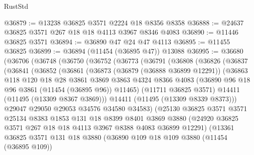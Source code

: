 \begin{lexlean}{RustStd}
\begin{coremodule}
@36879 := @13238 @36825 @3571 @2224 @18 @8356 @8358
@36888 := @24637 @36825 @3571 @267 @18 @18 @4113 @3967 @8346 @4083
@36890 := @11446 @36825 @3571
@36894 := @36890 @47 @24 @47 @4113
@36895 := @11455 @36825
@36899 := @36894 (@11454 (@36895 @47)) @13088
@36995 := @36680
    (@36706
      (@36748
        (@36750
          (@36752
            (@36773
              (@36791
                (@36808
                  (@36826
                    (@36837
                      (@36841
                        (@36852
                          (@36861
                            (@36873
                              (@36879 (@36888 @36899 @12291))
                              (@36863
                                @118
                                @120
                                @18
                                @28
                                @3861
                                @3869
                                @3863
                                @4324
                                @8366
                                @4083
                                (@36890 @96 @18 @96 @3861 (@11454 (@36895 @96)) @11465)
                                (@11711 @36825 @3571)
                                @14411
                                (@11495 (@13309 @8367 @3869)))
                              @14411
                              (@11495 (@13309 @8339 @8373)))
                            @29047
                            @29050
                            @29053
                            @34576
                            @34580
                            @34583)
                          (@25130
                            @36825
                            @3571
                            @3571
                            @25134
                            @8383
                            @1853
                            @131
                            @18
                            @8399
                            @8401
                            @3869
                            @3880
                            (@24920 @36825 @3571 @267 @18 @18 @4113 @3967 @8388 @4083 @36899 @12291)
                            (@13361
                              @36825
                              @3571
                              @131
                              @18
                              @3880
                              (@36890
                                @109
                                @18
                                @109
                                @3880
                                (@11454 (@36895 @109))

\end{coremodule}
\end{lexlean}
